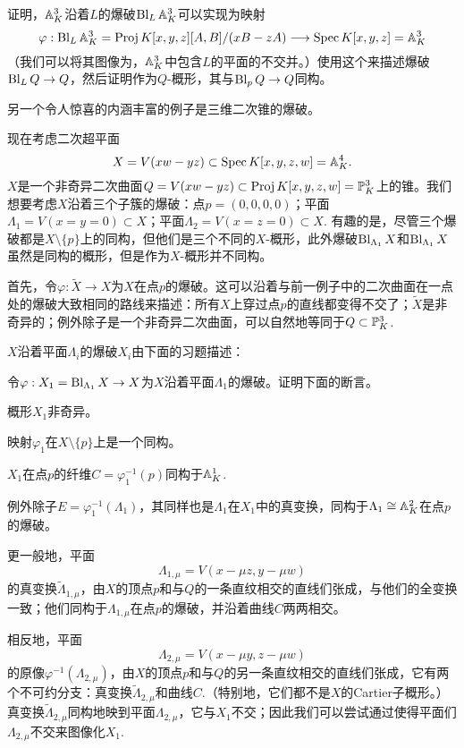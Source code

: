 \begin{exe}\label{exe:4.28}
	证明，$\mathbb{A}^3_K$沿着$L$的爆破$\operatorname{Bl}_L\mathbb{A}_K^3$可以实现为映射
	\[
		\varphi:\operatorname{Bl}_L \mathbb A_K^3=\operatorname{Proj} K[x,y,z][A,B]/(xB-zA)\longrightarrow \operatorname{Spec} K[x,y,z]=\mathbb A_K^3
	\]
	（我们可以将其图像为，$\mathbb{A}_K^3$中包含$L$的平面的不交并。）使用这个来描述爆破$\operatorname{Bl}_L Q\to Q$，然后证明作为$Q$-概形，其与$\operatorname{Bl}_p Q\to Q$同构。
\end{exe}

另一个令人惊喜的内涵丰富的例子是三维二次锥的爆破。

\begin{exa}\label{exa:4.29}
	现在考虑二次超平面
	\[
	X=V(xw-yz)\subset \operatorname{Spec} K[x,y,z,w]=\mathbb A_K^4.
	\]
	$X$是一个非奇异二次曲面$Q=V(xw-yz)\subset \operatorname{Proj} K[x,y,z,w]=\mathbb{P}_K^3$上的锥。我们想要考虑$X$沿着三个子簇的爆破：点$p=(0,0,0,0)$；平面$\Lambda_1=V(x=y=0)\subset X$；平面$\Lambda_2=V(x=z=0)\subset X$. 有趣的是，尽管三个爆破都是$X\setminus \{p\}$上的同构，但他们是三个不同的$X$-概形，此外爆破$\operatorname{Bl}_{\Lambda_1}X$和$\operatorname{Bl}_{\Lambda_1}X$虽然是同构的概形，但是作为$X$-概形并不同构。
\end{exa}

首先，令$\varphi:\tilde X\to X$为$X$在点$p$的爆破。这可以沿着与前一例子中的二次曲面在一点处的爆破大致相同的路线来描述：所有$X$上穿过点$p$的直线都变得不交了；$\tilde X$是非奇异的；例外除子是一个非奇异二次曲面，可以自然地等同于$Q\subset \mathbb{P}_K^3$.

$X$沿着平面$\Lambda_i$的爆破$X_i$由下面的习题描述：

\begin{exe}\label{exe:4.30}
	令$\varphi:X_1=\operatorname{Bl}_{\Lambda_1}X\to X$为$X$沿着平面$\Lambda_1$的爆破。证明下面的断言。
	\begin{compactenum}[(a)]
		\item 概形$X_1$非奇异。
		\item 映射$\varphi_1$在$X\setminus \{p\}$上是一个同构。
		\item $X_1$在点$p$的纤维$C=\varphi_1^{-1}(p)$同构于$\mathbb{A}_K^1$.
		\item 例外除子$E=\varphi_1^{-1}(\Lambda_1)$，其同样也是$\Lambda_1$在$X_1$中的真变换，同构于$\Lambda_1\cong \mathbb{A}_K^2$在点$p$的爆破。
		\item 更一般地，平面
			\[
				\Lambda_{1,\mu}=V(x-\mu z,y-\mu w)
			\]
			的真变换$\tilde \Lambda_{1,\mu}$，由$X$的顶点$p$和与$Q$的一条直纹相交的直线们张成，与他们的全变换一致；他们同构于$\Lambda_{1,\mu}$在点$p$的爆破，并沿着曲线$C$两两相交。\nottran
		\item 相反地，平面
			\[
				\Lambda_{2,\mu}=V(x-\mu y,z-\mu w)
			\]
			的原像$\varphi^{-1}(\Lambda_{2,\mu})$，由$X$的顶点$p$和与$Q$的另一条直纹相交的直线们张成，它有两个不可约分支：真变换$\tilde \Lambda_{2,\mu}$和曲线$C$.（特别地，它们都不是$X$的Cartier子概形。）真变换$\tilde \Lambda_{2,\mu}$同构地映到平面$\Lambda_{2,\mu}$，它与$X_1$不交；因此我们可以尝试通过使得平面们$\Lambda_{2,\mu}$不交来图像化$X_1$. \nottran

	\end{compactenum}
\end{exe}

